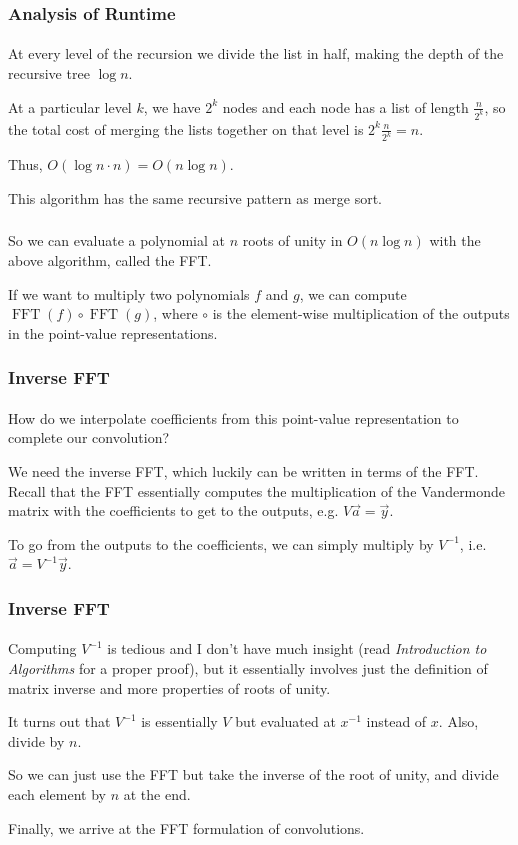 \documentclass[11pt,handout]{beamer}             %
\DeclareMathOperator{\FFT}{FFT}
\begin{document}
\begin{frame}
\frametitle{Analysis of Runtime}
\framesubtitle{}
At every level of the recursion we divide the list in half,
making the depth of the recursive tree \( \log n \). \pause

At a particular level \( k \), we have \( 2^k \) nodes and
each node has a list of length \( \frac{n}{2^k} \), so the total cost of
merging the lists together on that level is \( 2^k \frac{n}{2^k} = n \). \pause

Thus, \( O(\log n \cdot n) = O(n \log n) \).

This algorithm has the same recursive pattern as merge sort.
\end{frame}

\begin{frame}
\frametitle{}
\framesubtitle{}
So we can evaluate a polynomial at \( n \) roots of unity in \( O(n \log n) \)
with the above algorithm, called the \alert{FFT}. \pause

If we want to multiply two polynomials \( f \) and \( g \), we can compute
\( \FFT(f) \circ \FFT(g) \), where \( \circ \) is the element-wise multiplication
of the outputs in the point-value representations.
\end{frame}

\begin{frame}
\frametitle{Inverse FFT}
\framesubtitle{}
How do we interpolate coefficients from this point-value representation to
complete our convolution? \pause

We need the inverse FFT, which luckily can be written
in terms of the FFT. Recall that the FFT essentially computes the 
multiplication of the Vandermonde matrix with the coefficients to get to the
outputs, e.g. \( V \vec{a} = \vec{y} \). \pause

To go from the outputs to the coefficients, we can simply multiply
by \( V^{-1} \), i.e. \( \vec{a} = V^{-1} \vec{y} \).
\end{frame}

\begin{frame}
\frametitle{Inverse FFT}
\framesubtitle{}
Computing \( V^{-1} \) is tedious and I don't
have much insight (read \textit{Introduction to Algorithms} for a proper proof),
but it essentially involves just the definition of matrix inverse and more
properties of roots of unity. \pause 

It turns out that \( V^{-1} \) is essentially \( V \) but evaluated
at \( x^{-1} \) instead of \( x \). Also, divide by \( n \). \pause 

So we can just use the FFT but take the inverse of the root of unity,
and divide each element by \( n \) at the end. \pause

Finally, we arrive at the FFT formulation of convolutions.
\end{frame}
\end{document}
